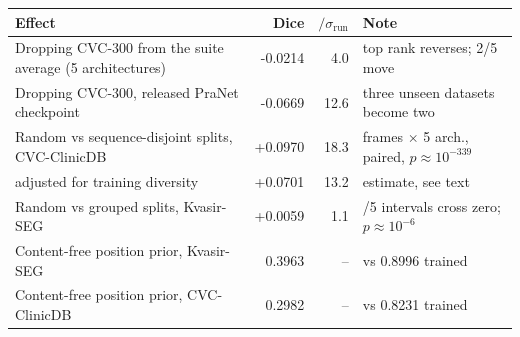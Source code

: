 \begin{tabularx}{\textwidth}{@{}Xrr>{\raggedright\arraybackslash}p{3.6cm}@{}}
\toprule
Effect & Dice & $/\sigma_{\mathrm{run}}$ & Note \\
\midrule
Dropping CVC-300 from the suite average (5 architectures) & -0.0214 & 4.0 & top rank reverses; 2/5 move \\
Dropping CVC-300, released PraNet checkpoint & -0.0669 & 12.6 & three unseen datasets become two \\
Random vs sequence-disjoint splits, CVC-ClinicDB & +0.0970 & 18.3 & 612 frames $\times$ 5 arch., paired, $p \approx 10^{-339}$ \\
\quad adjusted for training diversity & +0.0701 & 13.2 & estimate, see text \\
Random vs grouped splits, Kvasir-SEG & +0.0059 & 1.1 & 3/5 intervals cross zero; $p \approx 10^{-6}$ \\
Content-free position prior, Kvasir-SEG & 0.3963 & -- & vs 0.8996 trained \\
Content-free position prior, CVC-ClinicDB & 0.2982 & -- & vs 0.8231 trained \\
\bottomrule
\end{tabularx}
